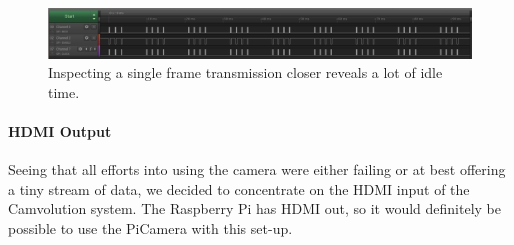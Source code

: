 \begin{figure}
    \centering
    \includegraphics[width=\linewidth]{img/logic/1frame}
    \caption[Idle time between SPI transmissions]{
        Inspecting a single frame transmission closer reveals a lot of idle time.
    }
    \label{fig:Logic1Frame}
\end{figure}

\paragraph{HDMI Output}
Seeing that all efforts into using the camera were either failing or at best offering a tiny stream of data,
we decided to concentrate on the HDMI input of the Camvolution system.
The Raspberry Pi has HDMI out, so it would definitely be possible to use the PiCamera with this set-up.
